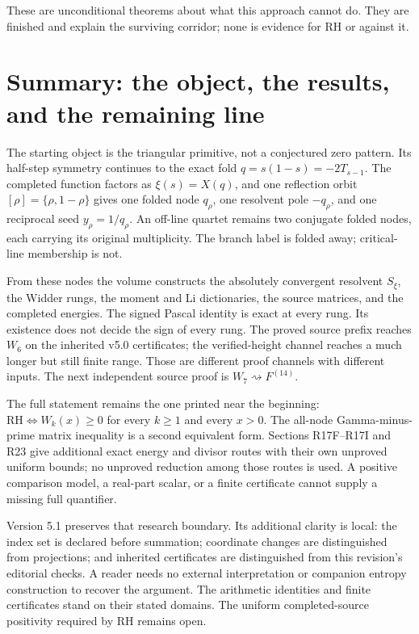 \documentclass[
  11pt,
]{book}
\begin{document}
These are unconditional theorems about what this approach cannot do.
They are finished and explain the surviving corridor; none is evidence
for RH or against it.

\chapter{Summary: the object, the results, and the remaining
line}\label{summary-the-object-the-results-and-the-remaining-line}

The starting object is the triangular primitive, not a conjectured zero
pattern. Its half-step symmetry continues to the exact fold
\(q=s(1-s)=-2T_{s-1}\). The completed function factors as
\(\xi(s)=X(q)\), and one reflection orbit \([\rho]=\{\rho,1-\rho\}\)
gives one folded node \(q_\rho\), one resolvent pole \(-q_\rho\), and
one reciprocal seed \(y_\rho=1/q_\rho\). An off-line quartet remains two
conjugate folded nodes, each carrying its original multiplicity. The
branch label is folded away; critical-line membership is not.

From these nodes the volume constructs the absolutely convergent
resolvent \(S_\xi\), the Widder rungs, the moment and Li dictionaries,
the source matrices, and the completed energies. The signed Pascal
identity is exact at every rung. Its existence does not decide the sign
of every rung. The proved source prefix reaches \(W_6\) on the inherited
v5.0 certificates; the verified-height channel reaches a much longer but
still finite range. Those are different proof channels with different
inputs. The next independent source proof is
\(W_7\rightsquigarrow F^{(14)}\).

The full statement remains the one printed near the beginning:
\(\mathrm{RH}\iff W_k(x)\ge0\) for every \(k\ge1\) and every \(x>0\).
The all-node Gamma-minus-prime matrix inequality is a second equivalent
form. Sections R17F--R17I and R23 give additional exact energy and
divisor routes with their own unproved uniform bounds; no unproved
reduction among those routes is used. A positive comparison model, a
real-part scalar, or a finite certificate cannot supply a missing full
quantifier.

Version 5.1 preserves that research boundary. Its additional clarity is
local: the index set is declared before summation; coordinate changes
are distinguished from projections; and inherited certificates are
distinguished from this revision's editorial checks. A reader needs no
external interpretation or companion entropy construction to recover the
argument. The arithmetic identities and finite certificates stand on
their stated domains. The uniform completed-source positivity required
by RH remains open.
\end{document}
